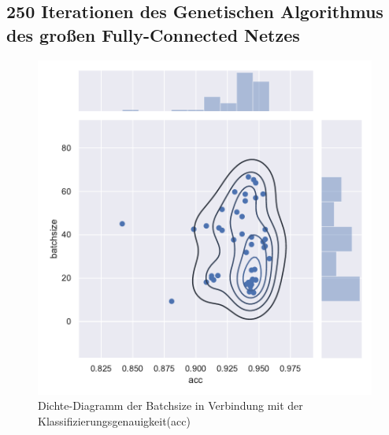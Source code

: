 \subsection{250 Iterationen des Genetischen Algorithmus des großen Fully-Connected Netzes}
\begin{figure}[H]
  \centering  
  \includegraphics[scale=0.5]{anhang/GA_250_mnist_digits_True_big_jointplot_batchsize.pdf}
  \caption{Dichte-Diagramm der Batchsize in Verbindung mit der Klassifizierungsgenauigkeit(acc)}
  
\end{figure}

